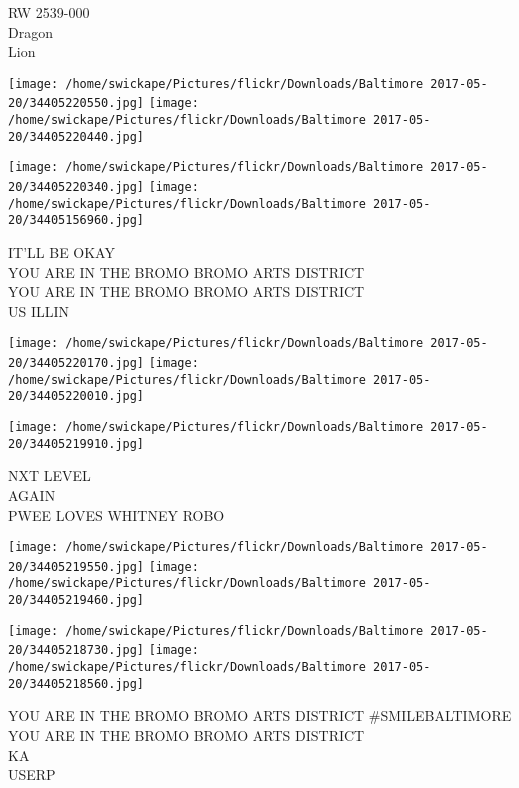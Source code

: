 \documentclass[10pt,letterpaper]{article}
\begin{document}
RW 2539{-}000\\
Dragon\\
Lion\\
\pagebreak

\texttt{[image: /home/swickape/Pictures/flickr/Downloads/Baltimore 2017-05-20/34405220550.jpg]}
\texttt{[image: /home/swickape/Pictures/flickr/Downloads/Baltimore 2017-05-20/34405220440.jpg]}

\texttt{[image: /home/swickape/Pictures/flickr/Downloads/Baltimore 2017-05-20/34405220340.jpg]}
\texttt{[image: /home/swickape/Pictures/flickr/Downloads/Baltimore 2017-05-20/34405156960.jpg]}

IT'LL BE OKAY\\
YOU ARE IN THE BROMO BROMO ARTS DISTRICT\\
YOU ARE IN THE BROMO BROMO ARTS DISTRICT\\
US ILLIN\\
\pagebreak

\texttt{[image: /home/swickape/Pictures/flickr/Downloads/Baltimore 2017-05-20/34405220170.jpg]}
\texttt{[image: /home/swickape/Pictures/flickr/Downloads/Baltimore 2017-05-20/34405220010.jpg]}

\vspace{0.25in}
\texttt{[image: /home/swickape/Pictures/flickr/Downloads/Baltimore 2017-05-20/34405219910.jpg]}

NXT LEVEL\\
AGAIN\\
PWEE LOVES WHITNEY ROBO\\
\pagebreak

\texttt{[image: /home/swickape/Pictures/flickr/Downloads/Baltimore 2017-05-20/34405219550.jpg]}
\texttt{[image: /home/swickape/Pictures/flickr/Downloads/Baltimore 2017-05-20/34405219460.jpg]}

\texttt{[image: /home/swickape/Pictures/flickr/Downloads/Baltimore 2017-05-20/34405218730.jpg]}
\texttt{[image: /home/swickape/Pictures/flickr/Downloads/Baltimore 2017-05-20/34405218560.jpg]}

YOU ARE IN THE BROMO BROMO ARTS DISTRICT \#SMILEBALTIMORE\\
YOU ARE IN THE BROMO BROMO ARTS DISTRICT\\
KA\\
USERP\\
\pagebreak
\end{document}
